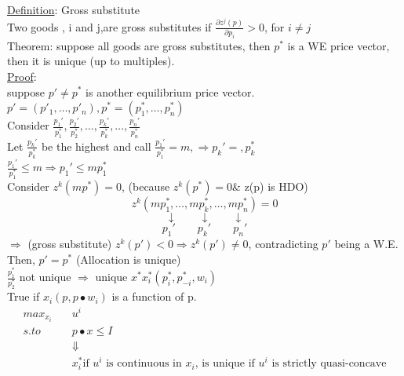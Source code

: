 \documentclass[letterpaper,13pt,single,pdftex]{scrartcl}
\begin{document}
\underline{Definition}: Gross substitute\\
Two goods , i and j,are gross substitutes if $\frac{\partial z^j(p)}{\partial p_i} > 0$, for $i \ne j$\\
Theorem: suppose all goods are gross substitutes, then $p^* $ is a WE price vector, then it is unique (up to multiples). \\
\underline{Proof}:\\
suppose $p' \ne p^*$ is another equilibrium price vector. \\
$p' = (p'_1, \dots, p'_n), p^*= (p_1^*,\dots, p_n^*)$\\
Consider $\frac{p_1'}{p_1^*},\frac{p_2'}{p_2^*},\dots,\frac{p_k'}{p_k^*},\dots,\frac{p_n'}{p_n^*}$\\
Let $\frac{p_k'}{p_k^*}$ be the highest and call $\frac{p_1'}{p_1^*} = m, \Rightarrow p_k' = ,p_k^*$\\
$\frac{p_1'}{p_1^*} \le m \Rightarrow p_1'\le mp_1^*$\\
Consider $z^k(mp^*) = 0$, (because $z^k(p^*) = 0 $& z(p) is HDO)\\
\[z^k(mp_1^*, \dots, mp_k^*,\dots, mp_n^*) = 0\]
\[ \downarrow \qquad \downarrow \qquad \downarrow\]
\[ p_1' \qquad p_k' \qquad p_n'\]
$\Rightarrow $ (gross substitute) $z^k(p') < 0 \Rightarrow z^k(p') \ne 0$, contradicting $p'$ being a W.E. \\
Then, $p' = p^*$  (Allocation is unique)\\

$\frac{p_1^*}{p_2^*}$ not unique $\Rightarrow$ unique $x^* x_i^*(p_i^*, p_{-i}^*,w_i)$\\
True if $x_i(p,p\bullet w_i)$ is a function of p. 
\begin{align*}
    max_{x_i} \quad &u^i \\
    s.to \quad &p\bullet x\le I\\
    &\Downarrow\\
    &x_i^*\text{if $u^i$ is continuous in $x_i$, is unique if $u^i$ is strictly quasi-concave}
\end{align*}
\end{document}
